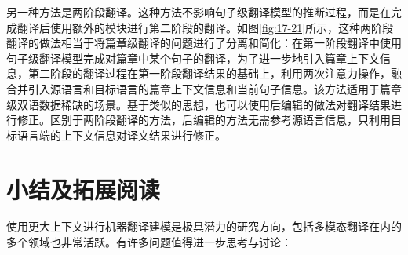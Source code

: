 \parinterval 另一种方法是两阶段翻译。这种方法不影响句子级翻译模型的推断过程，而是在完成翻译后使用额外的模块进行第二阶段的翻译。如图\ref{fig:17-21}所示，这种两阶段翻译的做法相当于将篇章级翻译的问题进行了分离和简化：在第一阶段翻译中使用句子级翻译模型完成对篇章中某个句子的翻译，为了进一步地引入篇章上下文信息，第二阶段的翻译过程在第一阶段翻译结果的基础上，利用两次注意力操作，融合并引入源语言和目标语言的篇章上下文信息和当前句子信息。该方法适用于篇章级双语数据稀缺的场景。基于类似的思想，也可以使用后编辑的做法对翻译结果进行修正。区别于两阶段翻译的方法，后编辑的方法无需参考源语言信息，只利用目标语言端的上下文信息对译文结果进行修正。

\sectionnewpage
\section{小结及拓展阅读}

\parinterval 使用更大上下文进行机器翻译建模是极具潜力的研究方向，包括多模态翻译在内的多个领域也非常活跃。有许多问题值得进一步思考与讨论：

